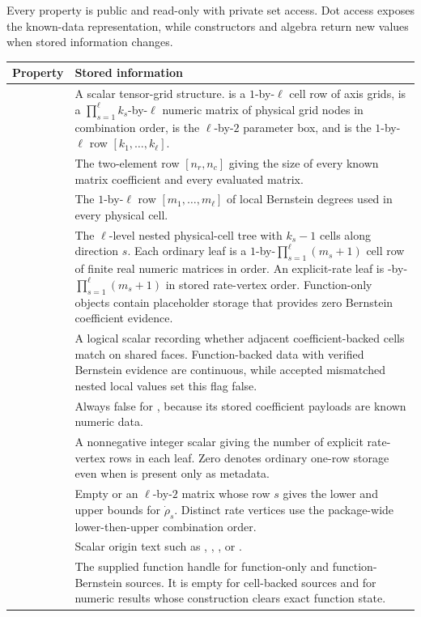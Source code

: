 Every  property is public and read-only with private set access. Dot access exposes the known-data representation, while constructors and algebra return new values when stored information changes.

\begin{tabularx}{\textwidth}{@{}p{}Y@{}}
\toprule
Property & Stored information \\
\midrule
{} & A scalar tensor-grid structure.  is a $1$-by-$\ell$ cell row of axis grids,  is a $\prod_{s=1}^{\ell}k_s$-by-$\ell$ numeric matrix of physical grid nodes in combination order,  is the $\ell$-by-$2$ parameter box, and  is the $1$-by-$\ell$ row $[k_1,\ldots,k_\ell]$. \\
 & The two-element row $[n_r,n_c]$ giving the size of every known matrix coefficient and every evaluated matrix. \\
 & The $1$-by-$\ell$ row $[m_1,\ldots,m_\ell]$ of local Bernstein degrees used in every physical cell. \\
 & The $\ell$-level nested physical-cell tree with $k_s-1$ cells along direction $s$. Each ordinary leaf is a $1$-by-$\prod_{s=1}^{\ell}(m_s+1)$ cell row of finite real numeric matrices in  order. An explicit-rate leaf is -by-$\prod_{s=1}^{\ell}(m_s+1)$ in stored rate-vertex order. Function-only objects contain placeholder storage that provides zero Bernstein coefficient evidence. \\
 & A logical scalar recording whether adjacent coefficient-backed cells match on shared faces. Function-backed data with verified Bernstein evidence are continuous, while accepted mismatched nested local values set this flag false. \\
 & Always false for , because its stored coefficient payloads are known numeric data. \\
 & A nonnegative integer scalar giving the number of explicit rate-vertex rows in each leaf. Zero denotes ordinary one-row storage even when  is present only as metadata. \\
 & Empty or an $\ell$-by-$2$ matrix whose row $s$ gives the lower and upper bounds for $\dot{\rho}_s$. Distinct rate vertices use the package-wide lower-then-upper combination order. \\
 & Scalar origin text such as , , , or . \\
 & The supplied function handle for function-only and function-Bernstein sources. It is empty for cell-backed sources and for numeric results whose construction clears exact function state. \\
\bottomrule
\end{tabularx}

